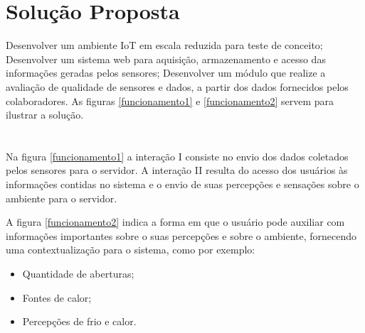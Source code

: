  \newpage
  \section{Solução Proposta}
  Desenvolver um ambiente \acrshort{IoT} em escala reduzida para teste de conceito;
  Desenvolver um sistema web para aquisição, armazenamento e acesso das informações geradas pelos sensores;
  Desenvolver um módulo que realize a avaliação de qualidade de sensores e dados, a partir dos dados fornecidos pelos colaboradores.
  As figuras \ref{funcionamento1} e \ref{funcionamento2} servem para ilustrar a solução.
  \\
  \\\\
  Na figura \ref{funcionamento1} a interação I consiste no envio dos dados coletados pelos sensores para o servidor.
  A interação II resulta do acesso dos usuários às informações contidas no sistema e o envio de suas percepções
  e sensações sobre o ambiente para o servidor.
\newpage



  A figura \ref{funcionamento2} indica a forma em que o usuário pode auxiliar com informações importantes
  sobre o suas percepções e sobre o ambiente, fornecendo uma contextualização para o sistema, como por exemplo:
  \begin{itemize}
    \item Quantidade de aberturas;
    \item Fontes de calor;
    \item Percepções de frio e calor.
  \end{itemize}
